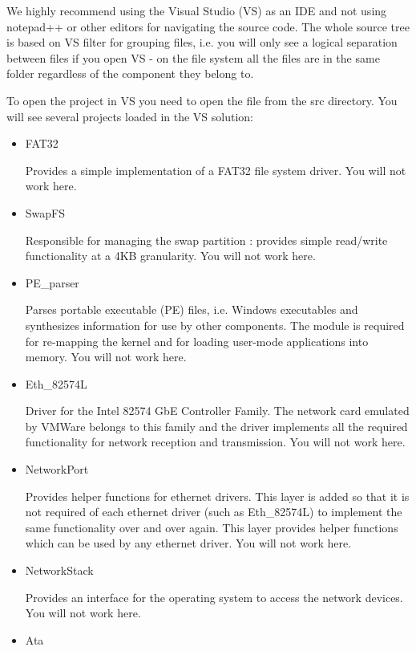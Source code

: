 We highly recommend using the Visual Studio (VS) as an IDE and not using notepad++ or other editors
for navigating the source code. The whole source tree is based on VS filter for grouping files, i.e.
you will only see a logical separation between files if you open VS - on the file system all the
files are in the same folder regardless of the component they belong to.

To open the project in VS you need to open the  file from the src directory. You
will see several projects loaded in the VS solution:
\begin{itemize}
	\item FAT32

	Provides a simple implementation of a FAT32 file system driver. You will not work here.

	\item SwapFS

	Responsible for managing the swap partition : provides simple read/write functionality at a 4KB
granularity. You will not work here.

	\item PE\_parser

	Parses portable executable (PE) files, i.e. Windows executables and synthesizes
information for use by other components. The module is required for re-mapping the kernel and for
loading user-mode applications into memory. You will not work here.

	\item Eth\_82574L

	Driver for the Intel 82574 GbE Controller Family. The network card emulated by VMWare belongs to
this family and the driver implements all the required functionality for network reception and
transmission. You will not work here.

	\item NetworkPort

	Provides helper functions for ethernet drivers. This layer is added so that it is not required
of each ethernet driver (such as Eth\_82574L) to implement the same functionality over and over
again. This layer provides helper functions which can be used by any ethernet driver. You will not
work here.

	\item NetworkStack

	Provides an interface for the operating system to access the network devices. You will not work
here.

	\item Ata


\end{itemize}
